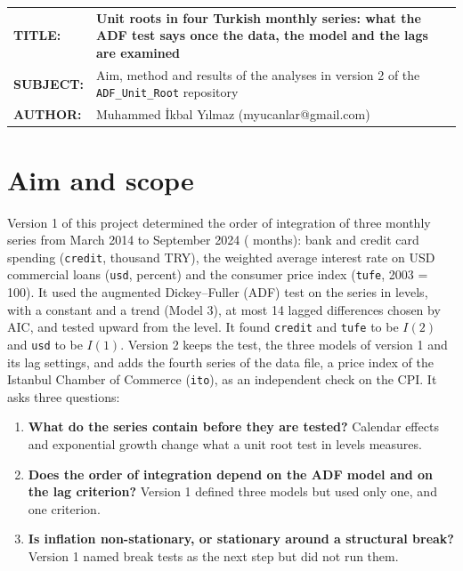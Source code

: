 \documentclass[11pt,a4paper]{article}
\begin{document}
\vspace*{14pt}
\begin{tabular}{@{}p{2.35cm}@{}p{\dimexpr\textwidth-2.35cm}@{}}
\textbf{TITLE:} & \textbf{\large Unit roots in four Turkish monthly series: what the ADF test says once the data, the model and the lags are examined}\\[3pt]
\textbf{SUBJECT:} & Aim, method and results of the analyses in version 2 of the \texttt{ADF\_Unit\_Root} repository\\[3pt]
\textbf{AUTHOR:} & Muhammed İkbal Yılmaz (myucanlar@gmail.com)
\end{tabular}

\vspace{8pt}
\vspace{12pt}

\section{Aim and scope}

Version 1 of this project determined the order of integration of three monthly series from March 2014 to September 2024
(\Months{} months): bank and credit card spending (\texttt{credit}, thousand TRY), the weighted average interest rate on USD
commercial loans (\texttt{usd}, percent) and the consumer price index (\texttt{tufe}, 2003 = 100). It used the augmented
Dickey--Fuller (ADF) test on the series in levels, with a constant and a trend (Model 3), at most 14 lagged differences chosen by
AIC, and tested upward from the level. It found \texttt{credit} and \texttt{tufe} to be $I(2)$ and \texttt{usd} to be $I(1)$.
Version 2 keeps the test, the three models of version 1 and its lag settings, and adds the fourth series of the data file, a price
index of the Istanbul Chamber of Commerce (\texttt{ito}), as an independent check on the CPI. It asks three questions:

\begin{enumerate}
  \item \textbf{What do the series contain before they are tested?} Calendar effects and exponential growth change what a unit
  root test in levels measures.
  \item \textbf{Does the order of integration depend on the ADF model and on the lag criterion?} Version 1 defined three models but
  used only one, and one criterion.
  \item \textbf{Is inflation non-stationary, or stationary around a structural break?} Version 1 named break tests as the next
  step but did not run them.
\end{enumerate}
\end{document}
